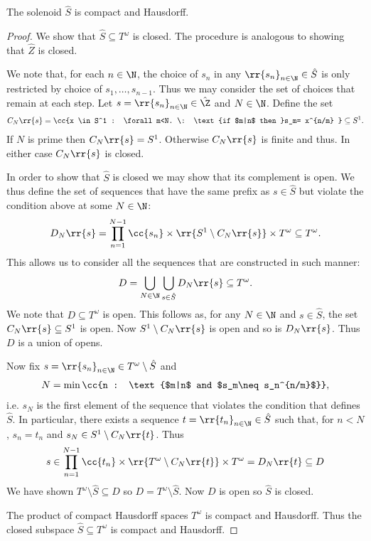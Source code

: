 \documentclass{article}
\begin{document}
\begin{claim*}
  The solenoid $\hat S$ is compact and Hausdorff.
  \begin{proof}
    We show that $\hat S\subseteq T^\omega$ is closed. The procedure is analogous to showing
    that $\hat Z$ is closed.

    We note that, for each $n\in\N$, the choice of $s_n$ in any $\rr{s_n}_{n\in\N}\in\hat S$
    is only restricted by choice of $s_1,\ldots,s_{n-1}$. Thus we may consider the set of
    choices that remain at each step.
    Let $s=\rr{s_n}_{n\in\N}\in\hat\Z$ and $N\in\N$. Define the set
    \begin{align*}
      C_N\rr{s} = \cc{x \in S^1 : \forall m<N. \: \text{if $m|n$ then }s_m= x^{n/m} }\subseteq S^1.
    \end{align*}
    If $N$ is prime then $C_N\rr{s}=S^1$. Otherwise $C_N\rr{s}$ is finite and thus. In either
    case $C_N\rr{s}$ is closed.

    In order to show that $\hat S$ is closed we may show that its complement is open. We thus define the
    set of sequences that have the same prefix as $s\in\hat S$ but violate the condition above
    at some $N\in\N$:
    \begin{align*}
      D_N\rr{s}=\prod_{n=1}^{N-1}\cc{s_n}\times\rr{S^1\setminus C_N\rr{s}}\times T^\omega \subseteq T^\omega.
    \end{align*}
    This allows us to consider all the sequences that are constructed in such manner:
    \begin{align*}
      D = \bigcup_{N\in\N}\bigcup_{s\in\hat S} D_N\rr{s} \subseteq T^\omega.
    \end{align*}
    We note that $D\subseteq T^\omega$ is open. This follows as, for any $N\in\N$ and
    $s\in\hat S$, the set $C_N\rr{s}\subseteq S^1$ is open. Now
    $S^1\setminus C_N\rr{s}$ is open and so is $D_N\rr{s}$. Thus $D$ is a union of opens.

    Now fix $s=\rr{s_n}_{n\in\N}\in T^\omega\setminus\hat S$ and
    \begin{align*}
      N=\min\cc{n : \text{$m|n$ and $s_m\neq s_n^{n/m}$}},
    \end{align*}
    i.e. $s_N$ is the first element of the sequence that violates the condition that defines $\hat S$.
    In particular, there exists a sequence $t=\rr{t_n}_{n\in\N}\in\hat S$ such that,
    for $n<N$, $s_n=t_n$ and $s_N\in S^1\setminus C_N\rr{t}$. Thus
    \begin{align*}
      s\in \prod_{n=1}^{N-1} \cc{t_n} \times \rr{T^\omega\setminus C_N\rr{t}} \times T^\omega= D_N\rr{t}\subseteq D
    \end{align*}
    We have shown $T^\omega\setminus\hat S\subseteq D$ so $D=T^\omega\setminus\hat S$. Now
    $D$ is open so $\hat S$ is closed.

    The product of compact Hausdorff spaces $T^\omega$ is compact and Hausdorff.
    Thus the closed subspace $\hat S\subseteq T^\omega$ is compact and Hausdorff.
  \end{proof}
\end{claim*}
\end{document}
